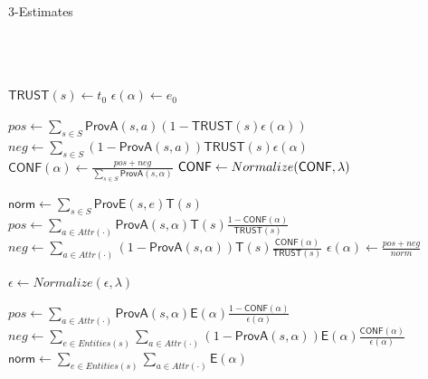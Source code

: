 \documentclass{acm_proc_article-sp}
\begin{document}
\begin{algorithm}
	\small
\caption{3-Estimates}
\label{alg:3e} 
\begin{algorithmic}[1]
	 \\
	 \\
 \\
		\State  $\mathsf{TRUST}(s) \gets t_0$
	\EndFor
			\State $\mathsf{\epsilon}(\alpha) \gets e_0 $
		\EndFor
	\EndFor

		  \State $pos \leftarrow \sum_{s\in S} \mathsf{ProvA}(s,a){(1- \mathsf{TRUST}(s) \mathsf{\epsilon}(\alpha) )}$
		  \State $neg \leftarrow \sum_{s\in S} (1-\mathsf{ProvA}(s,a)){\mathsf{TRUST}(s) \mathsf{\epsilon}(\alpha)}$
			\State $\mathsf{CONF}(\alpha) \gets \frac{pos + neg}{\sum_{s \in S} \mathsf{ProvA}(s,\alpha)}$ 
		\EndFor
	\EndFor
	\State $\mathsf{CONF} \leftarrow {\sc Normalize}(\mathsf{CONF},\lambda)$

                 \State $\mathsf{norm}  \gets {\sum_{s \in S} \mathsf{ProvE}(s,e) \mathsf{T}(s)} $
    			\State $pos \gets \sum_{a\in Attr(\cdot)}{\mathsf{ProvA}(s,\alpha) \mathsf{T}(s) \frac{1- \mathsf{CONF}(\alpha)}      {\mathsf{TRUST}(s)}}$
                          \State $neg \gets \sum_{a\in Attr(\cdot)}{(1 - \mathsf{ProvA}(s,\alpha)) \mathsf{T}(s) \frac{\mathsf{CONF}(\alpha)}
{\mathsf{TRUST}(s)}}$ 
			\State $\mathsf{\epsilon}(\alpha) \gets \frac{pos + neg}{norm}$ 
		\EndFor
	\EndFor


	\State $\mathsf{\epsilon} \gets Normalize(\mathsf{\epsilon},\lambda)$

		        \State $pos \gets \sum_{a\in Attr(\cdot)}{\mathsf{ProvA}(s,\alpha) \mathsf{E}(\alpha) \frac{1- \mathsf{CONF}(\alpha)}      {\mathsf{\epsilon}(\alpha)}}$
                          \State $neg \gets \sum_{e\in Entities(s)}  \sum_{a\in Attr(\cdot)}{(1 - \mathsf{ProvA}(s,\alpha)) \mathsf{E}(\alpha) \frac{\mathsf{CONF}(\alpha)}
{\mathsf{\epsilon}(\alpha)}}$ 
		       \State $\mathsf{norm}  \gets \sum_{e\in Entities(s)}  \sum_{a\in Attr(\cdot)}  \mathsf{E(\alpha)} $
		

\end{algorithmic}
\end{algorithm}
\end{document}

